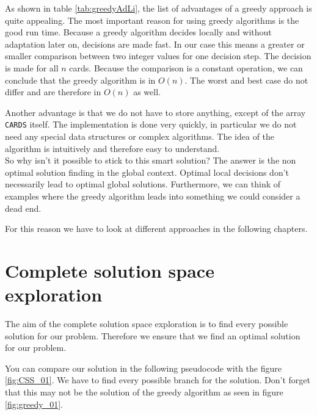 \documentclass[a4paper,12pt,fleqn]{article}
\newcommand\ezskip{\medskip\noindent}
\begin{document}
As shown in table \ref{tab:greedyAdLi}, the list of advantages of a greedy approach is quite appealing. The most important reason for using greedy algorithms is the good run time. Because a greedy algorithm decides locally and without adaptation later on, decisions are made fast. In our case this means a greater or smaller comparison between two integer values for one decision step. The decision is made for all $n$ cards. Because the comparison is a constant operation, we can conclude that the greedy algorithm is in $O(n)$. The worst and best case do not differ and are therefore in $O(n)$ as well. 

\ezskip Another advantage is that we do not have to store anything, except of the array \texttt{CARDS} itself. The implementation is done very quickly, in particular we do not need any special data structures or complex algorithms. The idea of the algorithm is intuitively and therefore easy to understand.\\
So why isn't it possible to stick to this smart solution? The answer is the non optimal solution finding in the global context. Optimal local decisions don't necessarily lead to optimal global solutions. Furthermore, we can think of examples where the greedy algorithm leads into something we could consider a dead end. 

For this reason we have to look at different approaches in the following chapters. 


\newpage

\section{Complete solution space exploration} \label{sec:completeSol}
The aim of the complete solution space exploration is to find every
possible solution for our problem. Therefore we ensure that we find
an optimal solution for our problem. 

You can compare our solution in the following pseudocode with the figure \ref{fig:CSS_01}. We have to find every possible branch for the solution. Don't forget that this may not be the solution of the greedy algorithm as seen in figure \ref{fig:greedy_01}. 
\end{document}
